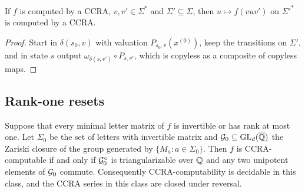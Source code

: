 \begin{lemma}\label{lem:quotients}
If $f$ is computed by a CCRA, $v,v'\in\Sigma^*$ and $\Sigma'\subseteq\Sigma$, then $u\mapsto f(vuv')$ on $\Sigma'^*$ is computed by a CCRA.
\end{lemma}
\begin{proof}
Start in $\delta(s_0,v)$ with valuation $P_{s_0,v}(x^{(0)})$, keep the transitions on $\Sigma'$, and in state $s$ output $\omega_{\delta(s,v')}\circ P_{s,v'}$, which is copyless as a composite of copyless maps.
\end{proof}

\subsection{Rank-one resets}
\begin{theorem}\label{thm:rankone}
Suppose that every minimal letter matrix of $f$ is invertible or has rank at most one. Let $\Sigma_0$ be the set of letters with invertible matrix and $\mathcal{G}_0\subseteq\mathrm{GL}_d(\overline{\mathbb{Q}})$ the Zariski closure of the group generated by $\{M_a:a\in\Sigma_0\}$. Then $f$ is CCRA-computable if and only if $\mathcal{G}_0^\circ$ is triangularizable over $\mathbb{Q}$ and any two unipotent elements of $\mathcal{G}_0$ commute. Consequently CCRA-computability is decidable in this class, and the CCRA series in this class are closed under reversal.
\end{theorem}
